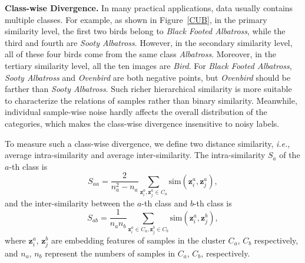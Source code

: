 \documentclass[lettersize,journal]{IEEEtran}
\begin{document}
\textbf{Class-wise Divergence.} In many practical applications, data usually contains  multiple classes.  For example, as shown in Figure~\ref{CUB}, in the primary similarity level, the first two birds  belong to \textit{Black Footed Albatross}, while  the third and fourth  are \textit{Sooty Albatross}. However, in the secondary similarity level, all of these four birds come from the same class \textit{Albatross}. Moreover, in the tertiary similarity level, all the ten images are \textit{Bird}. For \textit{Black Footed Albatross}, \textit{Sooty Albatross} and \textit{Ovenbird} are both negative points, but \textit{Ovenbird} should be farther than \textit{Sooty Albatross}. Such richer hierarchical similarity is more suitable to characterize the relations of samples rather than binary similarity. Meanwhile, individual sample-wise noise hardly affects the overall distribution of the categories, which makes the class-wise divergence insensitive to noisy labels. 

 To measure such a class-wise divergence, we define two distance similarity, \textit{i.e.}, average intra-similarity and average inter-similarity. The intra-similarity $S_a$ of the $a$-th class is 
\begin{equation}
	S_{aa} = \frac{2}{n_a^2 - n_a} \sum_{\mathbf{z}^a_i,\mathbf{z}^a_j \in C_a} \text{sim}( \mathbf{z}^a_i ,\mathbf{z}^a_j ),
	\label{Saa}
\end{equation}
and the inter-similarity between the  $a$-th class and $b$-th class is 
\begin{equation}
	S_{ab} = \frac{1}{n_an_b} \sum_{\mathbf{z}^a_i \in C_a,\mathbf{z}^b_j \in C_b}\text{sim}( \mathbf{z}^a_i , \mathbf{z}^b_j ),
	\label{Sab}
\end{equation}
where $\mathbf{z}^a_i$, $\mathbf{z}^b_j$ are embedding features of samples in the cluster $C_a$, $C_b$ respectively, and $n_a$, $n_b$ represent the numbers of samples in $C_a$, $C_b$, respectively. 
\end{document}
